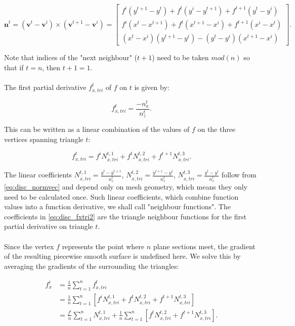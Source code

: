 \documentclass{article}
\begin{document}
\begin{equation} \label{eq:disc_normvec}
 \textbf{n}^t = (\textbf{v}^t - \textbf{v}^i) \times (\textbf{v}^{t+1} - \textbf{v}^i) = \begin{bmatrix}
 f^i (y^{t+1} - y^t) + f^t (y^i - y^{t+1}) + f^{t+1} (y^t - y^i) \\
 f^i (x^t - x^{t+1}) + f^t (x^{t+1} - x^i) + f^{t+1} (x^i - x^t) \\ 
 (x^t - x^i) (y^{t+1} - y^i) - (y^t - y^i) (x^{t+1} - x^i)
 \end{bmatrix}.
\end{equation}

Note that indices of the "next neighbour" ($t+1$) need to be taken $mod(n)$ so that if $t=n$, then $t+1=1$.\\
\\
The first partial derivative $f_{x,tri}^t$ of $f$ on $t$ is given by:

\begin{equation} \label{eq:disc_fxtri}
f_{x,tri}^t = \frac{-n_x^t}{n_z^t}.
\end{equation}

This can be written as a linear combination of the values of $f$ on the three vertices spanning triangle $t$:

\begin{equation} \label{eq:disc_fxtri2}
f_{x,tri}^t = f^i N_{x,tri}^{t,1} + f^t N_{x,tri}^{t,2} + f^{t+1} N_{x,tri}^{t,3}.
\end{equation}

The linear coefficients $N_{x,tri}^{t,1} = \frac{y^t - y^{t+1}}{n_z^t}$, $N_{x,tri}^{t,2} = \frac{y^{t+1} - y^i}{n_z^t}$, $N_{x,tri}^{t,3} = \frac{y^t - y^i}{n_z^t}$ follow from \eqref{eq:disc_normvec} and depend only on mesh geometry, which means they only need to be calculated once. Such linear coefficients, which combine function values into a function derivative, we shall call "neighbour functions". The coefficients in \eqref{eq:disc_fxtri2} are the triangle neighbour functions for the first partial derivative on triangle $t$.\\
\\
Since the vertex $f$ represents the point where $n$ plane sections meet, the gradient of the resulting piecewise smooth surface is undefined here. We solve this by averaging the gradients of the surrounding the triangles:

\begin{equation} \label{eq:disc_fxi}
\begin{split}
f_x^i &= \frac{1}{n} \sum_{t=1}^n f_{x,tri}^t \\
 &= \frac{1}{n} \sum_{t=1}^n \left[ f^i N_{x,tri}^{t,1} + f^t N_{x,tri}^{t,2} + f^{t+1} N_{x,tri}^{t,3} \right] \\
 &= \frac{f^i}{n} \sum_{t=1}^n N_{x,tri}^{t,1} + \frac{1}{n} \sum_{t=1}^n \left[ f^t N_{x,tri}^{t,2} + f^{t+1} N_{x,tri}^{t,3} \right].
\end{split}
\end{equation}
\end{document}
